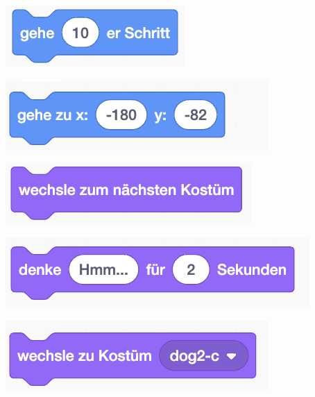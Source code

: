 \documentclass[a4paper, 12pt]{article}
\begin{document}
\begin{minipage}{0.33\textwidth}
	\includegraphics{blau_1.png}
\end{minipage}
\begin{minipage}{0.33\textwidth}
	\includegraphics{blau_2.png}
\end{minipage}
\begin{minipage}{0.33\textwidth}
	\includegraphics{lila_1.png}
\end{minipage}

\begin{minipage}{0.49\textwidth}
	\includegraphics{lila_2.png}
\end{minipage}
\begin{minipage}{0.49\textwidth}
	\includegraphics{lila_3.png}
\end{minipage}
\end{document}
